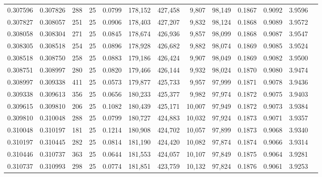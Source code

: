 \begin{tabular}{rrrrrrrrrrrrr}
0.307596 & 0.307826 &   288 &  25 &                                     0.0799 & 178,152 & 427,458 &   9,807 &  98,149 & 0.1867 & 0.9092 & 3.9596 \\
0.307827 & 0.308057 &   251 &  25 &                                     0.0906 & 178,403 & 427,207 &   9,832 &  98,124 & 0.1868 & 0.9089 & 3.9572 \\
0.308058 & 0.308304 &   271 &  25 &                                     0.0845 & 178,674 & 426,936 &   9,857 &  98,099 & 0.1868 & 0.9087 & 3.9547 \\
0.308305 & 0.308518 &   254 &  25 &                                     0.0896 & 178,928 & 426,682 &   9,882 &  98,074 & 0.1869 & 0.9085 & 3.9524 \\
0.308518 & 0.308750 &   258 &  25 &                                     0.0883 & 179,186 & 426,424 &   9,907 &  98,049 & 0.1869 & 0.9082 & 3.9500 \\
0.308751 & 0.308997 &   280 &  25 &                                     0.0820 & 179,466 & 426,144 &   9,932 &  98,024 & 0.1870 & 0.9080 & 3.9474 \\
0.308997 & 0.309338 &   411 &  25 &                                     0.0573 & 179,877 & 425,733 &   9,957 &  97,999 & 0.1871 & 0.9078 & 3.9436 \\
0.309338 & 0.309613 &   356 &  25 &                                     0.0656 & 180,233 & 425,377 &   9,982 &  97,974 & 0.1872 & 0.9075 & 3.9403 \\
0.309615 & 0.309810 &   206 &  25 &                                     0.1082 & 180,439 & 425,171 &  10,007 &  97,949 & 0.1872 & 0.9073 & 3.9384 \\
0.309810 & 0.310048 &   288 &  25 &                                     0.0799 & 180,727 & 424,883 &  10,032 &  97,924 & 0.1873 & 0.9071 & 3.9357 \\
0.310048 & 0.310197 &   181 &  25 &                                     0.1214 & 180,908 & 424,702 &  10,057 &  97,899 & 0.1873 & 0.9068 & 3.9340 \\
0.310197 & 0.310445 &   282 &  25 &                                     0.0814 & 181,190 & 424,420 &  10,082 &  97,874 & 0.1874 & 0.9066 & 3.9314 \\
0.310446 & 0.310737 &   363 &  25 &                                     0.0644 & 181,553 & 424,057 &  10,107 &  97,849 & 0.1875 & 0.9064 & 3.9281 \\
0.310737 & 0.310993 &   298 &  25 &                                     0.0774 & 181,851 & 423,759 &  10,132 &  97,824 & 0.1876 & 0.9061 & 3.9253 \\

\end{tabular}

